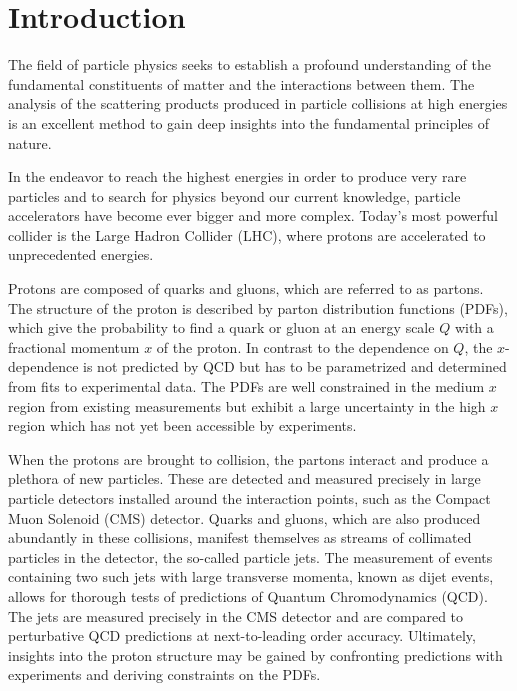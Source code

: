 
\chapter{Introduction}

The field of particle physics seeks to establish a profound understanding
of the fundamental constituents of matter and the interactions between them.
The analysis of the scattering products produced in particle collisions at high
energies is an excellent method to gain deep insights into the fundamental
principles of nature.

In the endeavor to reach the highest energies in order to produce very rare
particles and to search for physics beyond our current knowledge, particle
accelerators have become ever bigger and more complex. Today's most powerful collider
is the Large Hadron Collider (LHC), where protons are accelerated to unprecedented energies. 

Protons are composed of quarks and gluons, which are referred to as partons.
The structure of the proton is described by parton distribution functions
(PDFs), which give the probability to find a quark or gluon at an
energy scale $Q$ with a fractional momentum $x$ of the proton. In contrast to
the dependence on $Q$, the $x$-dependence is not predicted by QCD but has to be parametrized and
determined from fits to experimental data. The PDFs are well constrained in the
medium $x$ region from existing measurements but exhibit a large uncertainty in
the high $x$ region which has not yet been accessible by experiments.

When the protons are brought to collision, the partons interact and produce a
plethora of new particles. These are detected and measured precisely in large
particle detectors installed around the interaction points, such as the Compact
Muon Solenoid (CMS) detector. Quarks and gluons, which are also produced
abundantly in these collisions, manifest themselves as streams of collimated
particles in the detector, the so-called particle jets. The measurement of events
containing two such jets with large transverse momenta, known as dijet events,
allows for thorough tests of predictions of Quantum Chromodynamics (QCD). The
jets are measured precisely in the CMS detector and are compared to perturbative
QCD predictions at next-to-leading order accuracy. Ultimately, insights into
the proton structure may be gained by confronting predictions with experiments
and deriving constraints on the PDFs.

